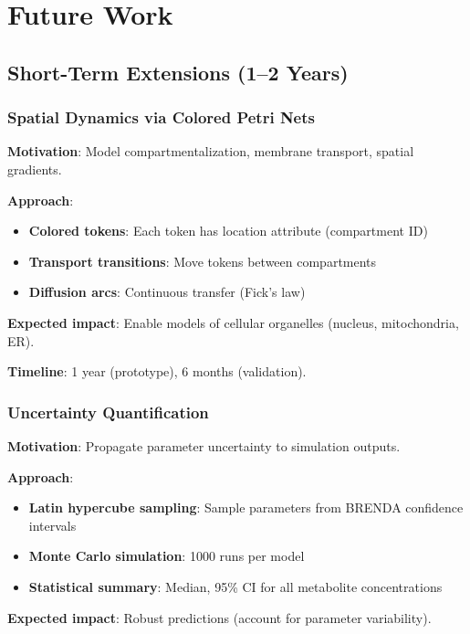 \section{Future Work}
\label{sec:future-work}

\subsection{Short-Term Extensions (1--2 Years)}
\label{subsec:short-term}

\subsubsection{Spatial Dynamics via Colored Petri Nets}

\textbf{Motivation}: Model compartmentalization, membrane transport, spatial gradients.

\textbf{Approach}:
\begin{itemize}
    \item \textbf{Colored tokens}: Each token has location attribute (compartment ID)
    \item \textbf{Transport transitions}: Move tokens between compartments
    \item \textbf{Diffusion arcs}: Continuous transfer (Fick's law)
\end{itemize}

\textbf{Expected impact}: Enable models of cellular organelles (nucleus, mitochondria, ER).

\textbf{Timeline}: 1 year (prototype), 6 months (validation).

\subsubsection{Uncertainty Quantification}

\textbf{Motivation}: Propagate parameter uncertainty to simulation outputs.

\textbf{Approach}:
\begin{itemize}
    \item \textbf{Latin hypercube sampling}: Sample parameters from BRENDA confidence intervals
    \item \textbf{Monte Carlo simulation}: 1000 runs per model
    \item \textbf{Statistical summary}: Median, 95\% CI for all metabolite concentrations
\end{itemize}

\textbf{Expected impact}: Robust predictions (account for parameter variability).


